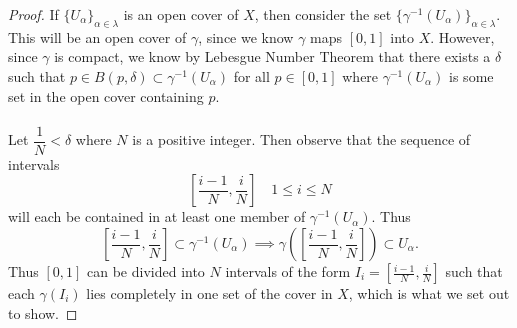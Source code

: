 \documentclass[a4paper,12pt,twoside]{hmcpset}
\begin{document}
\begin{proof}
    If $\{U_\alpha\}_{\alpha \in \lambda}$ is an open cover of $X$,
    then consider the set $\{\gamma^{-1}(U_\alpha)\}_{\alpha \in
    \lambda}$. This will be an open cover of $\gamma$, since we know
    $\gamma$ maps $[0, 1]$ into $X$. However, since $\gamma$ is
    compact, we know by Lebesgue Number Theorem that there exists a
    $\delta$ such that $p \in B(p, \delta) \subset
    \gamma^{-1}(U_\alpha)$ for all $p \in [0, 1]$ where
    $\gamma^{-1}(U_\alpha)$ is some set in the open cover containing
    $p$.
    \\
    \\
    Let $\dfrac{1}{N} < \delta$ where $N$ is a positive integer. Then
    observe that the sequence of intervals 
    \[
        \left[\frac{i-1}{N}, \frac{i}{N}\right] \quad 1 \le i \le N  
    \]
    will each be contained in at least one member of
    $\gamma^{-1}(U_\alpha)$. Thus 
    \[
        \left[\frac{i-1}{N}, \frac{i}{N}\right] \subset \gamma^{-1}(U_\alpha) 
        \implies \gamma\left(\left[\frac{i-1}{N}, \frac{i}{N}\right]\right) \subset U_\alpha.  
    \] 
    Thus $[0, 1]$ can be divided into  $N$
    intervals of the form $I_i = [\frac{i - 1}{N}, \frac{i}{N}]$ 
    such that
    each $\gamma(I_i)$ lies completely in one set of the cover in $X$,
    which is what we set out to show.
\end{proof}
\end{document}

